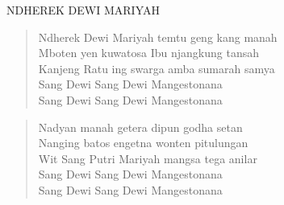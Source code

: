 \small
\itshape{
\begin{center}
NDHEREK DEWI MARIYAH\end{center} 
\begin{verse}
Ndherek Dewi Mariyah temtu geng kang manah \\
Mboten yen kuwatosa Ibu njangkung tansah \\
Kanjeng Ratu ing swarga amba sumarah samya \\
Sang Dewi Sang Dewi Mangestonana \\
Sang Dewi Sang Dewi Mangestonana 
\end{verse}
\begin{verse}
Nadyan manah getera dipun godha setan\\ 
Nanging batos engetna wonten pitulungan\\ 
Wit Sang Putri Mariyah mangsa tega anilar\\ 
Sang Dewi Sang Dewi Mangestonana \\
Sang Dewi Sang Dewi Mangestonana 
\end{verse}
}
\normalsize